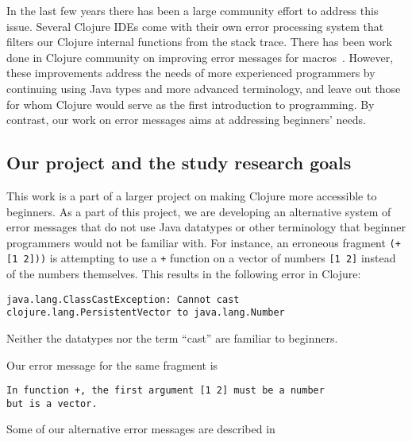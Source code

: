 \documentclass[12pt]{article}
\newcommand{\comment}[1]{{\bf \tt  {#1}}}
\newcommand{\emcomment}[1]{\textcolor{ForestGreen}{\comment{Elena: {#1}}}}
\begin{document}
In the last few years there has been a large community effort to address this issue. Several Clojure IDEs come with their own error processing system that filters our Clojure internal functions from the stack trace. There has been work done in Clojure community on improving error messages for macros~\cite{fleming}. However, these improvements address the needs of more experienced programmers by continuing using Java types and more advanced terminology, and leave out those for whom Clojure would serve as the first introduction to programming. By contrast, our work on error messages aims at addressing beginners' needs.  

	\subsection{Our project and the study research goals}\label{sec:goals}
This work is a part of a larger project on making Clojure more accessible to beginners. As a part of this project, we are developing an alternative system of error messages that do not use Java datatypes or other terminology that beginner programmers would not be familiar with. For instance, an erroneous fragment \texttt{(+ [1 2]))} is attempting to use a \texttt{+} function on a vector of numbers \texttt{[1 2]} instead of the numbers themselves. This results in the following error in Clojure:
\begin{verbatim}
java.lang.ClassCastException: Cannot cast 
clojure.lang.PersistentVector to java.lang.Number
\end{verbatim}
Neither the datatypes nor the term ``cast'' are familiar to beginners. 

Our error message for the same fragment is 
\begin{verbatim}
In function +, the first argument [1 2] must be a number 
but is a vector.
\end{verbatim}
Some of our alternative error messages are described in~\cite{mics2015}
  
\end{document}
